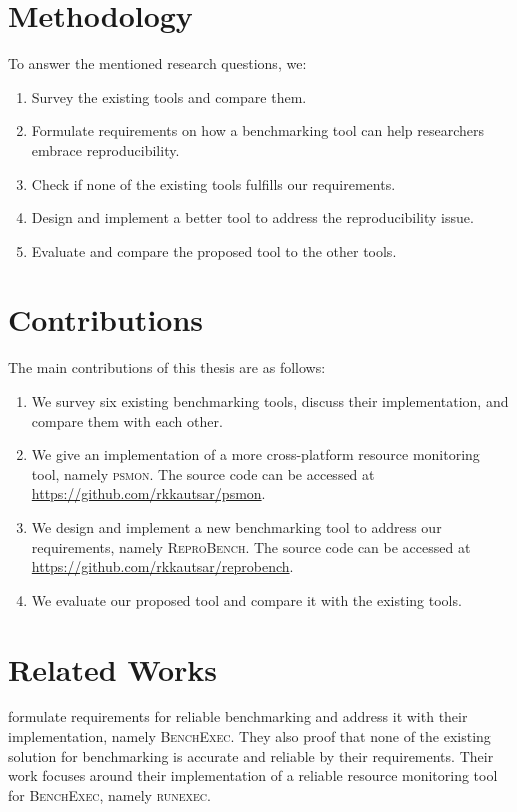 \section{Methodology}
\label{sec:intro.method}

To answer the mentioned research questions, we:
\begin{enumerate}
	\item Survey the existing tools and compare them.
	\item Formulate requirements on how a benchmarking tool can help researchers embrace reproducibility.
	\item Check if none of the existing tools fulfills our requirements.
	\item Design and implement a better tool to address the reproducibility issue.
	\item Evaluate and compare the proposed tool to the other tools.
\end{enumerate}

\section{Contributions}
\label{sec:intro.contributions}

The main contributions of this thesis are as follows:
\begin{enumerate}
	\item We survey six existing benchmarking tools, discuss their implementation, and compare them with each other.
	\item We give an implementation of a more cross-platform resource monitoring tool, namely \textsc{psmon}. The source code can be accessed at \url{https://github.com/rkkautsar/psmon}.
	\item We design and implement a new benchmarking tool to address our requirements, namely \textsc{ReproBench}. The source code can be accessed at \url{https://github.com/rkkautsar/reprobench}.
	\item We evaluate our proposed tool and compare it with the existing tools.
\end{enumerate}


\section{Related Works}
\label{sec:intro.related}

\citet{beyerReliableBenchmarkingRequirements2019} formulate requirements for reliable benchmarking and address it with their implementation, namely \textsc{BenchExec}.
They also proof that none of the existing solution for benchmarking is accurate and reliable by their requirements.
Their work focuses around their implementation of a reliable resource monitoring tool for \textsc{BenchExec}, namely \textsc{runexec}.

